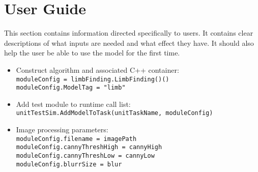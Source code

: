 
\section{User Guide}
This section contains information directed specifically to users. It contains clear descriptions of what inputs are needed and what effect they have. It should also help the user be able to use the model for the first time.

\begin{itemize}
\item Construct algorithm and associated C++ container:\\
\texttt{moduleConfig = limbFinding.LimbFinding()()}\\
\texttt{moduleConfig.ModelTag = "limb"}\\
\item Add test module to runtime call list: \\
\texttt{unitTestSim.AddModelToTask(unitTaskName, moduleConfig)}\\
\item Image processing parameters: \\
\texttt{moduleConfig.filename = imagePath}\\
\texttt{moduleConfig.cannyThreshHigh = cannyHigh}\\
\texttt{moduleConfig.cannyThreshLow = cannyLow}\\
\texttt{moduleConfig.blurrSize = blur}\\
\end{itemize}